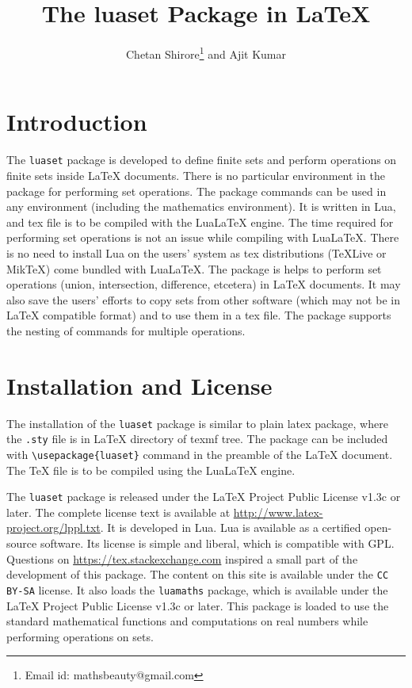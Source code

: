 \documentclass{article}
\begin{document}
\title{The luaset Package in LaTeX}
\author{Chetan Shirore\thanks{Email id: mathsbeauty@gmail.com} \space  and Ajit Kumar}
\maketitle
\section{Introduction}\label{section:introduction}
The \verb|luaset| package is developed to define finite sets and perform operations on finite sets inside LaTeX documents. There is no particular environment in the package for performing set operations. The package commands can be used in any environment (including the mathematics environment). It is written in Lua, and tex file is to be compiled with the LuaLaTeX engine. The time required for performing set operations is not an issue while compiling with LuaLaTeX. There is no need to install Lua on the users' system as tex distributions (TeXLive or MikTeX) come bundled with LuaLaTeX. The package is helps to perform set operations (union, intersection, difference, etcetera) in LaTeX documents. It may also save the users' efforts to copy sets from other software (which may not be in LaTeX compatible format) and to use them in a tex file. The package supports the nesting of commands for multiple operations. 

\section{Installation and License}

The installation of the \verb|luaset| package is similar to plain latex package, where the \texttt{.sty} file is in LaTeX directory of texmf tree. The package can be included with \verb|\usepackage{luaset}| command in the preamble of the LaTeX document. The TeX file is to be compiled using the LuaLaTeX engine.

The \verb|luaset| package is released under the LaTeX Project Public License v1.3c or later. The complete license text is available at \url{http://www.latex-project.org/lppl.txt}. It is developed in Lua.  Lua is available as a certified open-source software. Its license is simple and liberal, which is compatible with GPL. Questions on  \url{https://tex.stackexchange.com} inspired a small part of the development of this package. The content on this site is available under the \verb|CC BY-SA| license. It also loads the \verb|luamaths| package, which is available under the LaTeX Project Public License v1.3c or later. This package is loaded to use the standard mathematical functions and computations on real numbers while performing operations on sets.
\end{document}
